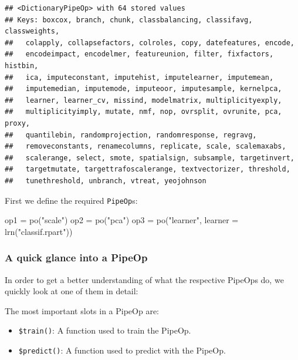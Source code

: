 \documentclass[
]{scrbook}
\newenvironment{Shaded}{\begin{snugshade}}{\end{snugshade}}
\newcommand{\AttributeTok}[1]{\textcolor[rgb]{0.77,0.63,0.00}{#1}}
\newcommand{\FunctionTok}[1]{\textcolor[rgb]{0.00,0.00,0.00}{#1}}
\newcommand{\NormalTok}[1]{#1}
\newcommand{\OtherTok}[1]{\textcolor[rgb]{0.56,0.35,0.01}{#1}}
\newcommand{\StringTok}[1]{\textcolor[rgb]{0.31,0.60,0.02}{#1}}
\providecommand{\tightlist}{%
  \setlength{\itemsep}{0pt}\setlength{\parskip}{0pt}}
\renewenvironment{Shaded} {\begin{snugshade}\small} {\end{snugshade}}
\begin{document}
\begin{verbatim}
## <DictionaryPipeOp> with 64 stored values
## Keys: boxcox, branch, chunk, classbalancing, classifavg, classweights,
##   colapply, collapsefactors, colroles, copy, datefeatures, encode,
##   encodeimpact, encodelmer, featureunion, filter, fixfactors, histbin,
##   ica, imputeconstant, imputehist, imputelearner, imputemean,
##   imputemedian, imputemode, imputeoor, imputesample, kernelpca,
##   learner, learner_cv, missind, modelmatrix, multiplicityexply,
##   multiplicityimply, mutate, nmf, nop, ovrsplit, ovrunite, pca, proxy,
##   quantilebin, randomprojection, randomresponse, regravg,
##   removeconstants, renamecolumns, replicate, scale, scalemaxabs,
##   scalerange, select, smote, spatialsign, subsample, targetinvert,
##   targetmutate, targettrafoscalerange, textvectorizer, threshold,
##   tunethreshold, unbranch, vtreat, yeojohnson
\end{verbatim}

First we define the required \texttt{PipeOp}s:

\begin{Shaded}
\begin{Highlighting}[]
\NormalTok{op1 }\OtherTok{=} \FunctionTok{po}\NormalTok{(}\StringTok{"scale"}\NormalTok{)}
\NormalTok{op2 }\OtherTok{=} \FunctionTok{po}\NormalTok{(}\StringTok{"pca"}\NormalTok{)}
\NormalTok{op3 }\OtherTok{=} \FunctionTok{po}\NormalTok{(}\StringTok{"learner"}\NormalTok{, }\AttributeTok{learner =} \FunctionTok{lrn}\NormalTok{(}\StringTok{"classif.rpart"}\NormalTok{))}
\end{Highlighting}
\end{Shaded}

\hypertarget{a-quick-glance-into-a-pipeop}{%
\subsubsection{A quick glance into a PipeOp}\label{a-quick-glance-into-a-pipeop}}

In order to get a better understanding of what the respective PipeOps do, we quickly look at one of them in detail:

The most important slots in a PipeOp are:

\begin{itemize}
\tightlist
\item
  \texttt{\$train()}: A function used to train the PipeOp.
\item
  \texttt{\$predict()}: A function used to predict with the PipeOp.
\end{itemize}
\end{document}
